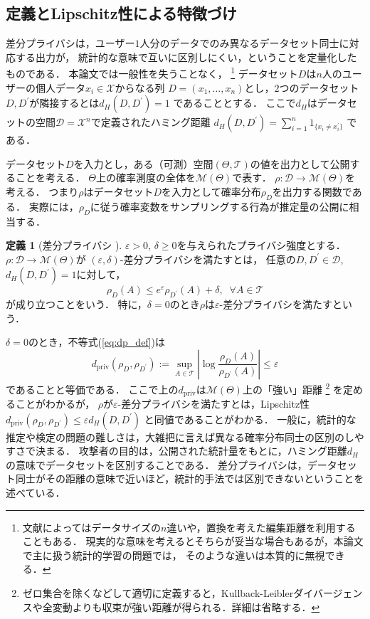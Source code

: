\documentclass{jarticle}
\theoremstyle{definition}
\newtheorem{defi}[thm]{定義}
\begin{document}
\subsection{定義とLipschitz性による特徴づけ}

差分プライバシは，ユーザー$1$人分のデータでのみ異なるデータセット同士に対応する出力が，
統計的な意味で互いに区別しにくい，ということを定量化したものである．
本論文では一般性を失うことなく，
\footnote{
文献によってはデータサイズの$n$違いや，置換を考えた編集距離を利用することもある．
現実的な意味を考えるとそちらが妥当な場合もあるが，本論文で主に扱う統計的学習の問題では，
そのような違いは本質的に無視できる．}
データセット$D$は$n$人のユーザーの個人データ$x_i \in \mathcal{X}$からなる列
$D=(x_1, \ldots, x_n )$とし，$2$つのデータセット$D,D^\prime$が隣接するとは$d_H(D,D^\prime)=1$
であることとする．
ここで$d_H$はデータセットの空間$\mathcal{D}=\mathcal{X}^n$で定義されたハミング距離
$d_H(D, D^\prime)=\sum_{i=1}^{n}1_{\{x_i \neq x_i^\prime \}}$
である．

データセット$D$を入力とし，ある（可測）空間$(\Theta, \mathcal{T})$の値を出力として公開することを考える．
$\Theta$上の確率測度の全体を$\mathcal{M}(\Theta)$で表す．
$\rho: \mathcal{D}\to\mathcal{M}(\Theta)$を考える．
つまり$\rho$はデータセット$D$を入力として確率分布$\rho_D$を出力する関数である．
実際には，$\rho_D$に従う確率変数をサンプリングする行為が推定量の公開に相当する．
\begin{defi}[差分プライバシ \cite{Dwork2006b}]
$\varepsilon>0$, $\delta \geq 0$を与えられたプライバシ強度とする．
$\rho: \mathcal{D}\to\mathcal{M}(\Theta)$が
$(\varepsilon, \delta)$-差分プライバシを満たすとは，
任意の$D, D^\prime \in \mathcal{D}$, $d_H(D,D^\prime)=1$に対して，
\begin{equation}
\rho_D(A) \leq e^\varepsilon \rho_{D^\prime}(A) + \delta, \;\; \forall A \in \mathcal{T}
\label{eq:dp_def}
\end{equation}
が成り立つことをいう．
特に，$\delta=0$のとき$\rho$は$\varepsilon$-差分プライバシを満たすという．
\end{defi}

$\delta=0$のとき，不等式(\ref{eq:dp_def})は
\begin{equation}
d_{\mathrm{priv}}(\rho_D, \rho_{D^\prime}):=
\sup_{A\in\mathcal{T}} \left| \log \frac{\rho_D(A)}{\rho_{D^\prime}(A)} \right |
\leq \varepsilon
\end{equation}
であることと等価である．
ここで上の$d_{\mathrm{priv}}$は$\mathcal{M}(\Theta)$上の「強い」距離
\footnote{ゼロ集合を除くなどして適切に定義すると，Kullback-Leiblerダイバージェンスや全変動よりも収束が強い距離が得られる．詳細は省略する．}
を定めることがわかるが，
$\rho$が$\varepsilon$-差分プライバシを満たすとは，Lipschitz性
$d_{\mathrm{priv}}(\rho_D, \rho_{D^\prime}) \leq \varepsilon d_H(D, D^\prime)$
と同値であることがわかる．
一般に，統計的な推定や検定の問題の難しさは，大雑把に言えば異なる確率分布同士の区別のしやすさで決まる．
攻撃者の目的は，公開された統計量をもとに，ハミング距離$d_H$の意味でデータセットを区別することである．
差分プライバシは，データセット同士がその距離の意味で近いほど，統計的手法では区別できないということを述べている．
\end{document}
